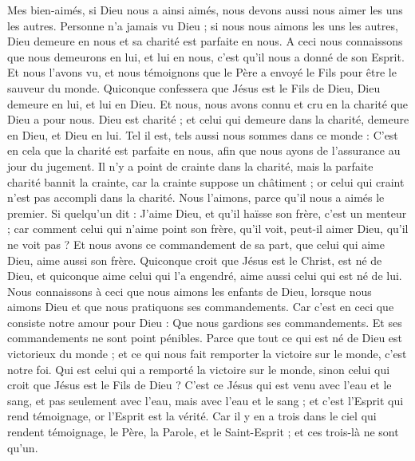 \begin{multicols}{2}
Mes bien-aimés, si Dieu nous a ainsi aimés, nous devons aussi nous aimer les uns les autres.
Personne n'a jamais vu Dieu ; si nous nous aimons les uns les autres, Dieu demeure en nous et sa charité est parfaite en nous.
A ceci nous connaissons que nous demeurons en lui, et lui en nous, c'est qu'il nous a donné de son Esprit.
Et nous l'avons vu, et nous témoignons que le Père a envoyé le Fils pour être le sauveur du monde.
Quiconque confessera que Jésus est le Fils de Dieu, Dieu demeure en lui, et lui en Dieu.
Et nous, nous avons connu et cru en la charité que Dieu a pour nous. Dieu est charité ; et celui qui demeure dans la charité, demeure en Dieu, et Dieu en lui.
Tel il est, tels aussi nous sommes dans ce monde : C’est en cela que la charité est parfaite en nous, afin que nous ayons de l’assurance au jour du jugement.
Il n'y a point de crainte dans la charité, mais la parfaite charité bannit la crainte, car la crainte suppose un châtiment ; or celui qui craint n'est pas accompli dans la charité.
Nous l'aimons, parce qu'il nous a aimés le premier.
Si quelqu'un dit : J'aime Dieu, et qu’il haïsse son frère, c’est un menteur ; car comment celui qui n'aime point son frère, qu'il voit, peut-il aimer Dieu, qu’il ne voit pas ?
Et nous avons ce commandement de sa part, que celui qui aime Dieu, aime aussi son frère.
\VerseOne{}Quiconque croit que Jésus est le Christ, est né de Dieu, et quiconque aime celui qui l'a engendré, aime aussi celui qui est né de lui.
Nous connaissons à ceci que nous aimons les enfants de Dieu, lorsque nous aimons Dieu et que nous pratiquons ses commandements.
Car c'est en ceci que consiste notre amour pour Dieu : Que nous gardions ses commandements. Et ses commandements ne sont point pénibles.
Parce que tout ce qui est né de Dieu est victorieux du monde ; et ce qui nous fait remporter la victoire sur le monde, c'est notre foi.
Qui est celui qui a remporté la victoire sur le monde, sinon celui qui croit que Jésus est le Fils de Dieu ?
C'est ce Jésus qui est venu avec l’eau et le sang, et pas seulement avec l'eau, mais avec l'eau et le sang ; et c'est l'Esprit qui rend témoignage, or l'Esprit est la vérité.
Car il y en a trois dans le ciel qui rendent témoignage, le Père, la Parole, et le Saint-Esprit ; et ces trois-là ne sont qu'un{}.

\end{multicols}
